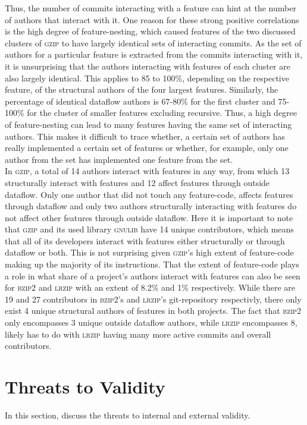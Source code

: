 Thus, the number of commits interacting with a feature can hint at the number of authors that interact with it.
One reason for these strong positive correlations is the high degree of feature-nesting, which caused features of the two discussed clusters of \textsc{gzip} to have largely identical sets of interacting commits.
As the set of authors for a particular feature is extracted from the commits interacting with it, it is unsurprising that the authors interacting with features of each cluster are also largely identical.
This applies to 85 to 100\%, depending on the respective feature, of the structural authors of the four largest features. 
Similarly, the percentage of identical dataflow authors is 67-80\% for the first cluster and 75-100\% for the cluster of smaller features excluding \textsf{recursive}.
Thus, a high degree of feature-nesting can lead to many features having the same set of interacting authors.
This makes it difficult to trace whether, a certain set of authors has really implemented a certain set of features or whether, for example, only one author from the set has implemented one feature from the set. \\
In \textsc{gzip}, a total of 14 authors interact with features in any way, from which 13 structurally interact with features and 12 affect features through outside dataflow.
Only one author that did not touch any feature-code, affects features through dataflow and only two authors structurally interacting with features do not affect other features through outside dataflow.
Here it is important to note that \textsc{gzip} and its used library \textsc{gnulib} have 14 unique contributors, which means that all of its developers interact with features either structurally or through dataflow or both.
This is not surprising given \textsc{gzip}'s high extent of feature-code making up the majority of its instructions.
That the extent of feature-code plays a role in what share of a project's authors interact with features can also be seen for \textsc{bzip2} and \textsc{lrzip} with an extent of 8.2\% and 1\% respectively.
While there are 19 and 27 contributors in \textsc{bzip2}'s and \textsc{lrzip}'s git-repository respectivly, there only exist 4 unique structural authors of features in both projects.
The fact that \textsc{bzip2} only encompasses 3 unique outside dataflow authors, while \textsc{lrzip} encompasses 8, likely has to do with \textsc{lrzip} having many more active commits and overall contributors.

\section{Threats to Validity}\label{sec:threats}

In this section, discuss the threats to internal and external validity.

